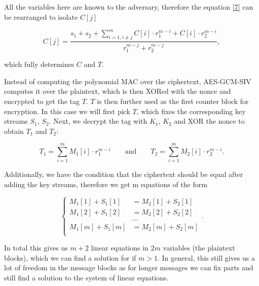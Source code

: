 \documentclass[a4paper,12pt]{spieman} %
\begin{document}
All the variables here are known to the adversary, therefore the equation \eqref{7} can be rearranged to isolate $C[j]$

\begin{equation}
C[j]=\frac{s_1+s_2+\sum\limits_{i=1,i\neq j}^mC[i]\cdot r^{m-i}_1+C[i]\cdot r^{m-i}_2}{r^{m-j}_1+r^{m-j}_2},
\end{equation}

\begin{flushleft}
which fully determines $C$ and $T$.
\end{flushleft}

Instead of computing the polynomial MAC over the ciphertext, AES-GCM-SIV computes it over the plaintext, which is then XORed with the nonce and encrypted to get the tag $T$. $T$ is then further used as the first counter block for encryption. In this case we will first pick $T$, which fixes the corresponding key streams $S_1$, $S_2$. Next, we decrypt the tag with $K_1$, $K_2$ and XOR the nonce to obtain $T_1$ and $T_2$:

\begin{equation}
T_1=\sum_{i=1}^mM_1[i]\cdot r^{m-i}_1 \qquad \text{and} \qquad T_2=\sum_{i=1}^mM_2[i]\cdot r^{m-i}_2.
\end{equation}

Additionally, we have the condition that the ciphertext should be equal after adding the key streams, therefore we get m equations of the form

\begin{equation}
\left\{
\begin{aligned}
M_1[1]+S_1[1]&=M_2[1]+S_2[1] \\
M_1[2]+S_1[2]&=M_2[2]+S_2[2] \\ 
&\dots \\ 
M_1[m]+S_1[m]&=M_2[m]+S_2[m] \\ 
\end{aligned}.
\right.
\end{equation}

In total this gives us $m + 2$ linear equations in $2m$ variables (the plaintext blocks), which we can find a solution for if $m > 1$. In general, this still gives us a lot of freedom in the message blocks as for longer messages we can fix parts and still find a solution to the system of linear equations.
\end{document}
